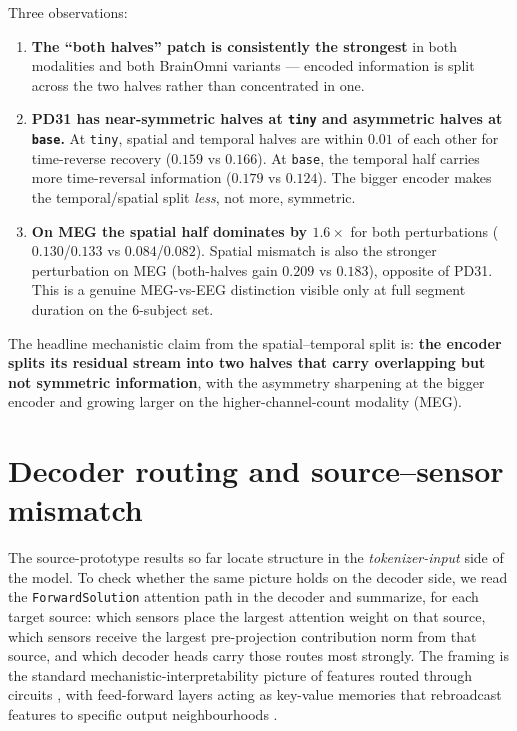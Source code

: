 \documentclass[11pt]{article}
\begin{document}
Three observations:
\begin{enumerate}[leftmargin=1.4em,itemsep=0.2em,topsep=0.3em]
\item \textbf{The ``both halves'' patch is consistently the strongest} in both
modalities and both BrainOmni variants --- encoded information is split
across the two halves rather than concentrated in one.
\item \textbf{PD31 has near-symmetric halves at \texttt{tiny} and asymmetric
halves at \texttt{base}.} At \texttt{tiny}, spatial and temporal halves are
within $0.01$ of each other for time-reverse recovery
($0.159$ vs $0.166$). At \texttt{base}, the temporal half carries more
time-reversal information ($0.179$ vs $0.124$). The bigger encoder makes the
temporal/spatial split \emph{less}, not more, symmetric.
\item \textbf{On MEG the spatial half dominates by $1.6\times$} for both
perturbations ($0.130$/$0.133$ vs $0.084$/$0.082$). Spatial mismatch is also
the stronger perturbation on MEG (both-halves gain $0.209$ vs $0.183$),
opposite of PD31. This is a genuine MEG-vs-EEG distinction visible only at
full segment duration on the 6-subject set.
\end{enumerate}

The headline mechanistic claim from the spatial--temporal split is:
\textbf{the encoder splits its residual stream into two halves that carry
overlapping but not symmetric information}, with the asymmetry sharpening at
the bigger encoder and growing larger on the higher-channel-count modality
(MEG).

\section{Decoder routing and source--sensor mismatch}\label{sec:routing}

The source-prototype results so far locate structure in the
\emph{tokenizer-input} side of the model. To check whether the same picture
holds on the decoder side, we read the \texttt{ForwardSolution} attention path
in the decoder and summarize, for each target source: which sensors place
the largest attention weight on that source, which sensors receive the largest
pre-projection contribution norm from that source, and which decoder heads
carry those routes most strongly. The framing is the standard
mechanistic-interpretability picture of features routed through circuits
\cite{olah2020zoomin,elhage2021framework}, with feed-forward layers acting
as key-value memories that rebroadcast features to specific output
neighbourhoods \cite{geva2021ffn}.
\end{document}
